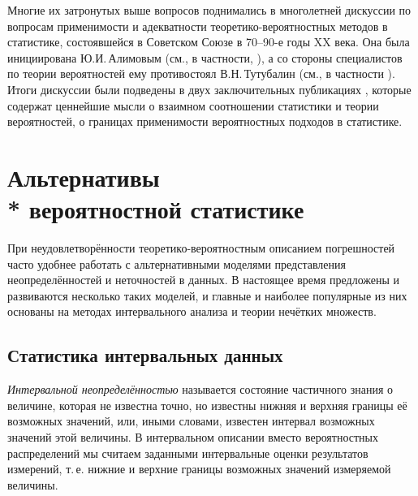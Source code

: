 \documentclass[a5paper,openany]{book}
\begin{document}
\medskip 
  
Многие их затронутых выше вопросов поднимались в многолетней дискуссии по вопросам 
применимости и адекватности теоретико-вероятностных методов в статистике, состоявшейся 
в Советском Союзе в 70--90-е годы XX века. Она была инициирована Ю.И.\,Алимовым (см., 
в частности, \cite{Alimov1980}), а со стороны специалистов по теории вероятностей ему 
противостоял В.Н.\,Тутубалин (см., в частности \cite{Tutubalin1977}). Итоги дискуссии 
были подведены в двух заключительных публикациях \cite{AlimovKravtsov, Tutubalin1993}, 
которые содержат ценнейшие мысли о взаимном соотношении статистики и теории 
вероятностей, о границах применимости вероятностных подходов в статистике. 
   
   
\section[Альтернативы вероятностной статистике]%
        {Альтернативы \\* вероятностной статистике} 
  
При неудовлетворённости теоретико-вероятностным описанием погрешностей часто удобнее 
работать с альтернативными моделями представления неопределённостей и неточностей 
в данных. В настоящее время предложены и развиваются несколько таких моделей, и 
главные и наиболее популярные из них основаны на методах интервального анализа и  
теории нечётких множеств. 
  
  
\subsection{Статистика интервальных данных} 
\label{InteStatistiSect}    
   
   
\textit{Интервальной неопределённостью} называется состояние частичного знания 
о величине, которая не известна точно, но известны нижняя и верхняя границы её возможных 
значений, или, иными словами, известен интервал 
возможных значений этой величины. В интервальном описании вместо вероятностных 
распределений мы считаем заданными интервальные оценки результатов измерений, т.\,е. 
нижние и верхние границы возможных значений измеряемой величины. 
  
\end{document}
